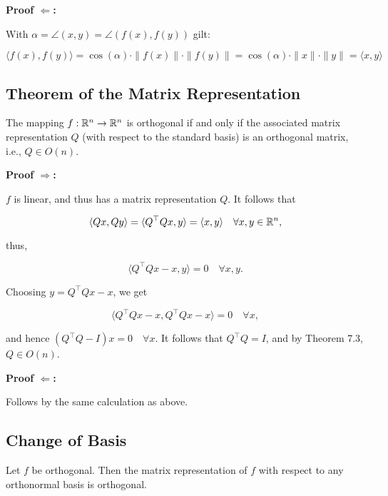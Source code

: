 \QED
\vspace{\baselineskip}

\textbf{Proof \(\Leftarrow\):} 

With \(\alpha = \angle(x, y) = \angle(f(x), f(y))\) gilt:

\[
    \langle f(x), f(y) \rangle = \cos(\alpha) \cdot \|f(x)\| \cdot \|f(y)\| = \cos(\alpha) 
    \cdot \|x\| \cdot \|y\| = \langle x, y \rangle
\]

\QED

\subsection{Theorem of the Matrix Representation}

The mapping \( f : \mathbb{R}^n \to \mathbb{R}^n \) is orthogonal if and only if  
the associated matrix representation \( Q \) (with respect to the standard basis) is an orthogonal matrix, i.e., \( Q \in O(n) \).
\vspace{\baselineskip}

\textbf{Proof \(\Rightarrow\):} 

\( f \) is linear, and thus has a matrix representation \( Q \). It follows that

\[
    \langle Qx, Qy \rangle = \langle Q^\top Qx, y \rangle = \langle x, y \rangle \quad \forall x, y 
    \in \mathbb{R}^n,
\]

thus,

\[
    \langle Q^\top Qx - x, y \rangle = 0 \quad \forall x, y.
\]

Choosing \( y = Q^\top Qx - x \), we get

\[
    \langle Q^\top Qx - x, Q^\top Qx - x \rangle = 0 \quad \forall x,
\]

and hence \( (Q^\top Q - I)x = 0 \quad \forall x \).  
It follows that \( Q^\top Q = I \), and by Theorem 7.3, \( Q \in O(n) \).

\QED
\vspace{\baselineskip}

\textbf{Proof \(\Leftarrow\):} 

Follows by the same calculation as above.

\QED

\subsection{Change of Basis}

Let \( f \) be orthogonal. Then the matrix representation of \( f \)  
with respect to any orthonormal basis is orthogonal.
\vspace{\baselineskip}

